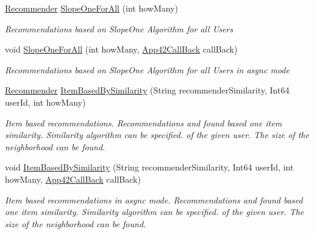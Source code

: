 \begin{DoxyCompactItemize}
\hyperlink{classcom_1_1shephertz_1_1app42_1_1paas_1_1sdk_1_1csharp_1_1recommend_1_1_recommender}{Recommender} \hyperlink{classcom_1_1shephertz_1_1app42_1_1paas_1_1sdk_1_1csharp_1_1recommend_1_1_recommender_service_a386cb107f29fa4e7267d8e8aac930bc5}{Slope\+One\+For\+All} (int how\+Many)
\begin{DoxyCompactList}\small\item\em Recommendations based on Slope\+One Algorithm for all Users \end{DoxyCompactList}\item 
void \hyperlink{classcom_1_1shephertz_1_1app42_1_1paas_1_1sdk_1_1csharp_1_1recommend_1_1_recommender_service_accdb059c7aa7aa46aeaf7bc64bcccca4}{Slope\+One\+For\+All} (int how\+Many, \hyperlink{interfacecom_1_1shephertz_1_1app42_1_1paas_1_1sdk_1_1csharp_1_1_app42_call_back}{App42\+Call\+Back} call\+Back)
\begin{DoxyCompactList}\small\item\em Recommendations based on Slope\+One Algorithm for all Users in async mode \end{DoxyCompactList}\item 
\hyperlink{classcom_1_1shephertz_1_1app42_1_1paas_1_1sdk_1_1csharp_1_1recommend_1_1_recommender}{Recommender} \hyperlink{classcom_1_1shephertz_1_1app42_1_1paas_1_1sdk_1_1csharp_1_1recommend_1_1_recommender_service_ad3f6e01a661b02eefced4fba0ff9e69f}{Item\+Based\+By\+Similarity} (String recommender\+Similarity, Int64 user\+Id, int how\+Many)
\begin{DoxyCompactList}\small\item\em Item based recommendations. Recommendations and found based one item similarity. Similarity algorithm can be specified. of the given user. The size of the neighborhood can be found. \end{DoxyCompactList}\item 
void \hyperlink{classcom_1_1shephertz_1_1app42_1_1paas_1_1sdk_1_1csharp_1_1recommend_1_1_recommender_service_aa53cc73860f4883ee155d482c0ebdfb8}{Item\+Based\+By\+Similarity} (String recommender\+Similarity, Int64 user\+Id, int how\+Many, \hyperlink{interfacecom_1_1shephertz_1_1app42_1_1paas_1_1sdk_1_1csharp_1_1_app42_call_back}{App42\+Call\+Back} call\+Back)
\begin{DoxyCompactList}\small\item\em Item based recommendations in async mode. Recommendations and found based one item similarity. Similarity algorithm can be specified. of the given user. The size of the neighborhood can be found. \end{DoxyCompactList}\item 

\end{DoxyCompactItemize}
